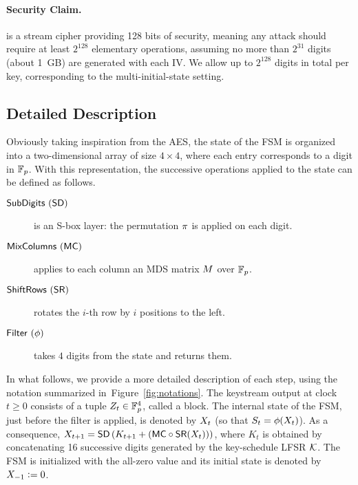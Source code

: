 \paragraph{Security Claim.} \coolName{} is a stream cipher providing 128
bits of security, meaning any attack should require at least $2^{128}$
elementary operations, assuming no more than $2^{31}$ digits (about
1~GB) are generated with each IV.  We allow up to $2^{128}$ digits in
total per key, corresponding to the multi-initial-state setting.



%


\subsection{Detailed Description}
\label{sec:sepc-details}

Obviously taking inspiration from the AES, the state of the FSM is organized into a two-dimensional array of size $4\times 4$, where each entry corresponds to a digit in $\mathbb{F}_p$. With this representation, the successive operations applied to the state can be defined as follows.
\begin{description}
\item[$\text{\textsf{SubDigits}}~(\text{\textsf{SD}})$] is an S-box layer: the permutation $\pi$ is applied on each digit.
\item[$\text{\textsf{MixColumns}}~(\text{\textsf{MC}})$] applies to each column an MDS matrix $M$ over \(\mathbb{F}_p\).
\item[$\text{\textsf{ShiftRows}}~(\text{\textsf{SR}})$] rotates the $i$-th row by $i$ positions to the left.
\item[$\text{\textsf{Filter}}~(\mathbf{\phi})$] takes $4$ digits from the state and returns them. 
\end{description}

In what follows, we provide a more detailed description of each step, using the notation summarized in~Figure~\ref{fig:notations}. The keystream output at clock $t \geq 0$ consists of a tuple $Z_t \in \mathbb{F}_{p}^4$, called a block. The internal state of the FSM, just before the filter is applied, is denoted by $X_{t}$ (so that $S_t = \phi(X_{t})$). As a consequence, $X_{t+1} = \text{\textsf{SD}}\left(K_{t+1} + \left(\text{\textsf{MC}} \circ \text{\textsf{SR}} (X_{t})\right)\right)$, where $K_t$ is obtained by concatenating 16 successive digits generated by the key-schedule LFSR $\mathcal{K}$. The FSM is initialized with the all-zero value and its initial state is denoted by $X_{-1} \vcentcolon= 0$.


